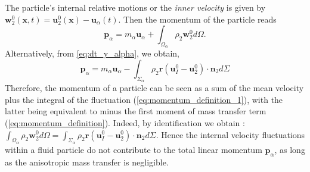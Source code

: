 The particle's internal relative motions or the \textit{inner velocity} is given by $\textbf{w}_2^0(\textbf{x},t) = \textbf{u}_2^0(\textbf{x}) - \textbf{u}_\alpha(t)$. Then the momentum of the particle reads
\begin{equation}
    \label{eq:momentum_definition_1}
    \textbf{p}_\alpha
    = m_\alpha \textbf{u}_\alpha
    + \int_{\Omega_\alpha} \rho_2 \textbf{w}_2^0 d\Omega.
\end{equation}
Alternatively, from \eqref{eq:dt_y_alpha}, we obtain,
\begin{equation}
    \textbf{p}_\alpha
    =  m_\alpha \textbf{u}_\alpha
    - \int_{\Sigma_\alpha} \rho_2\textbf{r}(\textbf{u}_I^0 - \textbf{u}_2^0)\cdot \textbf{n}_2 d\Sigma
    \label{eq:momentum_definition}
\end{equation}
Therefore, the momentum of a particle can be seen as a sum of the mean velocity plus the integral of the fluctuation (\ref{eq:momentum_definition_1}), with the latter being equivalent to minus the first moment of mass transfer term (\ref{eq:momentum_definition}).
Indeed, by identification we obtain : $\int_{\Omega_\alpha} \rho_2 \textbf{w}_2^0 d\Omega =\int_{\Sigma_\alpha}  \rho_2\textbf{r} (\textbf{u}_I^0 - \textbf{u}_2^0)\cdot \textbf{n}_2 d\Sigma$. 
Hence the internal velocity fluctuations within a fluid particle do not contribute to the total linear momentum $\textbf{p}_\alpha$, as long as the anisotropic mass transfer is negligible.  

